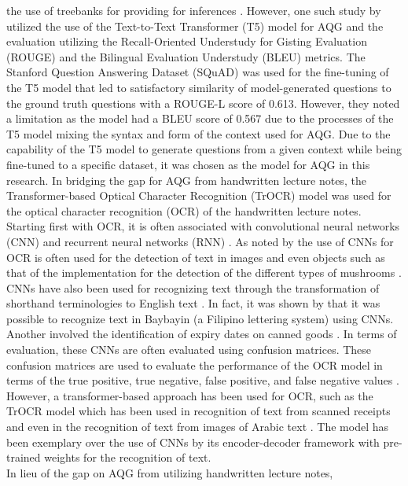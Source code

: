 \documentclass[conference]{IEEEtran}
\begin{document}
the use of treebanks for providing for inferences \cite{Mesina2020}. However, one such study
by \cite{Tsai2021} utilized the use of the Text-to-Text Transformer (T5) model for AQG and
the evaluation utilizing the Recall-Oriented Understudy for Gisting Evaluation (ROUGE)
and the Bilingual Evaluation Understudy (BLEU) metrics. 
The Stanford Question Answering Dataset (SQuAD) was used for the 
fine-tuning of the T5 model that led to satisfactory similarity of model-generated
questions to the ground truth questions with a ROUGE-L score of 0.613. However,
they noted a limitation as the model had a BLEU score of 0.567 due to the processes
of the T5 model mixing the syntax and form of the context used for AQG. Due to 
the capability of the T5 model to generate questions from a given context while 
being fine-tuned to a specific dataset, it was chosen as the model for AQG in this 
research. In bridging the gap for AQG from handwritten lecture notes,
the Transformer-based Optical Character Recognition (TrOCR) model was used for the optical character recognition (OCR) of the 
handwritten lecture notes. Starting first with OCR, it is often associated with 
convolutional neural networks (CNN) and recurrent neural networks (RNN) \cite{Gallenero2023}. As noted 
by \cite{Calimag2023} the use of CNNs for OCR is often used for the detection of text
in images and even objects such as that of the implementation for the detection 
of the different types of mushrooms \cite{Sutayco2024}. CNNs have also been used for 
recognizing text through the transformation of shorthand terminologies to 
English text \cite{Padilla2020}. In fact, it was shown by \cite{Ligsay2022} that it was 
possible to recognize text in Baybayin (a Filipino lettering system) 
using CNNs. Another involved the identification of expiry dates on 
canned goods \cite{Manlises2024}. In terms of evaluation, these CNNs are often evaluated 
using confusion matrices. These confusion matrices are used to evaluate the
performance of the OCR model in terms of the true positive, true negative, false
positive, and false negative values \cite{Villaverde2023}. However, a transformer-based
approach has been used for OCR, such as the TrOCR model \cite{Li2021} which has been used in recognition of text from 
scanned receipts \cite{Zhang2023} and even in the recognition of text from images of 
Arabic text \cite{Mortadi2023}. The model has been exemplary over the use of CNNs by its 
encoder-decoder framework with pre-trained weights for the recognition of text.
\\
\indent In lieu of the gap on AQG from utilizing handwritten lecture notes, 
\end{document}
